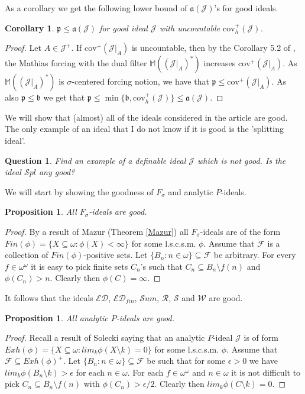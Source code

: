 \documentclass[a4paper]{amsart}
\newtheorem{proposition}[theorem]{Proposition}
\newtheorem{corollary}[theorem]{Corollary}
\newtheorem{question}[theorem]{Question}
\newcommand{\aaa}{\mathfrak{a}}
\newcommand{\bbb}{\mathfrak{b}}
\newcommand{\ppp}{\mathfrak{p}}
\newcommand{\cov}{\mathrm{cov}}
\newcommand{\J}{\mathcal{J}}
\newcommand{\RandomGraph}{\mathcal{R}}
\newcommand{\Solecki}{\mathcal{S}}
\newcommand{\ED}{\mathcal{ED}}
\newcommand{\SUM}{\mathcal{S}um}
\newcommand{\SPL}{\mathcal{S}pl}
\newcommand{\WANDER}{\mathcal{W}}
\begin{document}
As a corollary we get the following lower bound of $\aaa(\J)$'s for good ideals.
\begin{corollary}
    $\ppp\leq\aaa(\J)$ for good ideal $\J$ with uncountable $\cov^{+}_{h}(\J)$.
\end{corollary}
\begin{proof}
    Let $A\in\J^{+}$. If $\cov^{+}(\J|_{A})$ is uncountable, then by the Corollary 5.2 of \cite{FarkasZdomskyy}, the Mathias forcing with the dual filter $\mathbb{M}((\J|_{A})^{*})$ increases $\cov^{+}(\J|_{A})$. As $\mathbb{M}((\J|_{A})^{*})$ is $\sigma$-centered forcing notion, we have that $\ppp\leq\cov^{+}(\J|_{A})$. As also $\ppp\leq\bbb$ we get that $\ppp\leq\min\{\bbb,\cov^{+}_{h}(\J)\}\leq\aaa(\J)$.
\end{proof}
We will show that (almost) all of the ideals considered in the article are good. The only example of an ideal that I do not know if it is good is the 'splitting ideal'.
\begin{question}
    Find an example of a definable ideal $\J$ which is not good. Is the ideal $\SPL$ any good?
\end{question}
We will start by showing the goodness of $F_{\sigma}$ and analytic $P$-ideals.
\begin{proposition}
    All $F_{\sigma}$-ideals are good.
\end{proposition}
\begin{proof}
    By a result of Mazur (Theorem \ref{Mazur}) all $F_{\sigma}$-ideals are of the form $Fin(\phi)=\{X\subseteq\omega:\phi(X)<\infty\}$ for some l.s.c.s.m. $\phi$. Assume that $\mathcal{F}$ is a collection of $Fin(\phi)$-positive sets. Let $\{B_{n}:n\in\omega\}\subseteq\mathcal{F}$ be arbitrary.
    For every $f\in\omega^{\omega}$ it is easy to pick finite sets $C_{n}$'s such that $C_{n}\subseteq B_{n}\setminus f(n)$ and $\phi(C_{n})>n$. Clearly then $\phi(C)=\infty$.
\end{proof}
It follows that the ideals $\ED$, $\ED_{fin}$, $\SUM$, $\RandomGraph$, $\Solecki$ and $\WANDER$ are good.
\begin{proposition}
    All analytic $P$-ideals are good.
\end{proposition}
\begin{proof}
    Recall a result of Solecki saying that an analytic $P$-ideal $\J$ is of form $Exh(\phi)=\{X\subseteq\omega:lim_{k}\phi(X\setminus k)=0\}$ for some l.s.c.s.m. $\phi$. Assume that $\mathcal{F}\subseteq Exh(\phi)^{+}$. Let $\{B_{n}:n\in\omega\}\subseteq\mathcal{F}$ be such that for some $\epsilon>0$ we have $lim_{k}\phi(B_{n}\setminus k)>\epsilon$ for each $n\in\omega$. For each $f\in\omega^{\omega}$ and $n\in\omega$ it is not difficult to pick $C_{n}\subseteq B_{n}\setminus f(n)$ with $\phi(C_{n})>\epsilon/2$. Clearly then $lim_{k}\phi(C\setminus k)=0$.
\end{proof}
\end{document}
